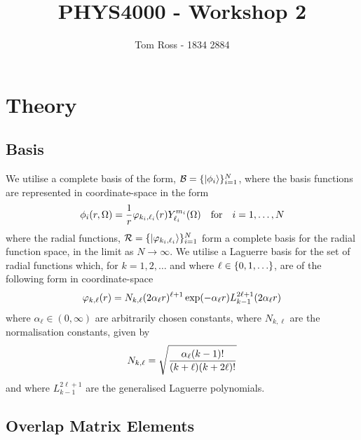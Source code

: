 \documentclass[draft]{article}
\title{PHYS4000 - Workshop 2}
\author{Tom Ross - 1834 2884}
\date{}
\begin{document}
\section*{Theory}

\subsection*{Basis}

We utilise a complete basis of the form,
$\mathcal{B} = \lbrace\ket{\phi_{i}}\rbrace_{i = 1}^{N}$, where the basis functions
are represented in coordinate-space in the form
\begin{equation}
  \label{eq:basis}
  \phi_{i}\lr{r, \Omega}
  =
  \dfrac{1}{r}
  \varphi_{k_{i}, \ell_{i}}\lr{r}
  Y_{\ell_{i}}^{m_{i}}\lr{\Omega}
  \qq{for}
  i = 1, \dotsc, N
\end{equation}
where the radial functions,
$\mathcal{R} = \lbrace\ket{\varphi_{k_{i}, \ell_{i}}}\rbrace_{i = 1}^{N}$ form a
complete basis for the radial function space, in the limit as $N \to \infty$.
We utilise a Laguerre basis for the set of radial functions which,
for $k = 1, 2, \dotsc$ and where $\ell \in \lrset{0, 1, \dotsc}$, are of the
following form in coordinate-space
\begin{equation}
  \label{eq:basis-lag}
  \varphi_{k, \ell}\lr{r}
  =
  N_{k, \ell}
  \lr
  {
    2
    \alpha_{\ell}
    r
  }^{\ell + 1}
  \exponential\lr
  {
    -
    \alpha_{\ell}
    r
  }
  L_{k - 1}^{2 \ell + 1}\lr{2 \alpha_{\ell} r}
\end{equation}
where $\alpha_{\ell} \in (0, \infty)$ are arbitrarily chosen constants,
where $N_{k, \ell}$ are the normalisation constants, given by
\begin{equation}
  \label{eq:basis-lag-norm}
  N_{k, \ell}
  =
  \sqrt
  {
    \dfrac
    {
      \alpha_{\ell}
      (k - 1)!
    }
    {
      (k + \ell)
      (k + 2 \ell)!
    }
  }
\end{equation}
and where $L_{k - 1}^{2 \ell + 1}$ are the generalised Laguerre polynomials.

\subsection*{Overlap Matrix Elements}
\end{document}
